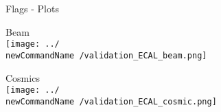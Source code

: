 \documentclass{beamer}
\newcommand{\newCommandName}{0522-0528}
\begin{document}
\begin{frame}{Flags - Plots}
  \begin{center}
          \begin{minipage}[t]{0.48\linewidth}
            \begin{center}
      Beam\\$ $ \\
      \texttt{[image: ../\\newCommandName /validation\_ECAL\_beam.png]}
    \end{center}	
  \end{minipage}
  \begin{minipage}[t]{0.48\linewidth}
    \begin{center}		
      Cosmics\\$ $\\
      \texttt{[image: ../\\newCommandName /validation\_ECAL\_cosmic.png]}
    \end{center}
  \end{minipage}
\end{center}
\end{frame}
\end{document}
